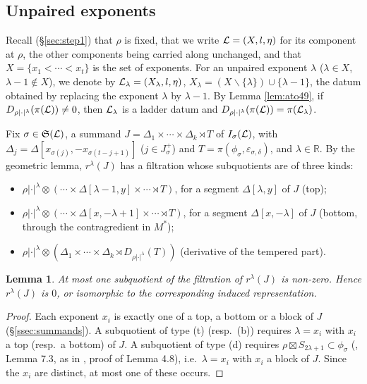 \documentclass[a4paper,12pt,leqno]{amsart}
\theoremstyle{plain}
\newtheorem{lemma}[thm]{Lemma}
\theoremstyle{definition}
\providecommand{\frS}{\mathfrak{S}}\providecommand{\frs}{\mathfrak{s}}
\begin{document}
\subsection{Unpaired exponents}\label{ssec:unpaired}
Recall (\S\ref{sec:step1}) that $\rho$ is fixed, that we write $\mathcal{L}=(X,l,\eta)$ for its component at
$\rho$, the other components being carried along unchanged, and that $X=\{x_1<\cdots<x_t\}$ is the set of
exponents. For an unpaired exponent $\lambda$ ($\lambda\in X$, $\lambda-1\notin X$), we denote by
$\mathcal{L}_\lambda=(X_\lambda,l,\eta)$, $X_\lambda=(X\smallsetminus\{\lambda\})\cup\{\lambda-1\}$, the datum obtained
by replacing the exponent $\lambda$ by $\lambda-1$. By Lemma \ref{lem:ato49}, if
$D_{\rho|\cdot|^\lambda}(\pi(\mathcal{L}))\neq0$, then $\mathcal{L}_\lambda$ is a ladder datum and
$D_{\rho|\cdot|^\lambda}(\pi(\mathcal{L}))=\pi(\mathcal{L}_\lambda)$.

Fix $\sigma\in\frS(\caL)$, a summand
$J=\Delta_1\times\cdots\times\Delta_k\rtimes T$ of $I_\sigma(\mathcal{L})$, with
$\Delta_j=\Delta[x_{\sigma(j)},-x_{\sigma(t-j+1)}]$ ($j\in J^+_\sigma$) and $T=\pi(\phi_\sigma,
\varepsilon_{\sigma,\delta})$, and $\lambda\in\mathbb{R}$. By the geometric lemma, $r^\lambda(J)$ has
a filtration whose subquotients are of three kinds:
\begin{itemize}
\item[(t)] $\rho|\cdot|^\lambda\otimes(\cdots\times\Delta[\lambda-1,y]\times\cdots\rtimes T)$, for
a segment $\Delta[\lambda,y]$ of $J$ (top);
\item[(b)] $\rho|\cdot|^\lambda\otimes(\cdots\times\Delta[x,-\lambda+1]\times\cdots\rtimes T)$, for
a segment $\Delta[x,-\lambda]$ of $J$ (bottom, through the contragredient in $M^*$);
\item[(d)] $\rho|\cdot|^\lambda\otimes(\Delta_1\times\cdots\times\Delta_k\rtimes
D_{\rho|\cdot|^\lambda}(T))$ (derivative of the tempered part).
\end{itemize}

\begin{lemma}\label{lem:onepiece} At most one subquotient of the filtration of $r^\lambda(J)$ is
non-zero. Hence $r^\lambda(J)$ is $0$, or isomorphic to the corresponding induced representation.
\end{lemma}

\begin{proof}
Each exponent $x_i$ is exactly one of a top, a bottom or a block of $J$ (\S\ref{ssec:summands}). A
subquotient of type (t) (resp.\ (b)) requires $\lambda=x_i$ with $x_i$ a top (resp.\ a bottom) of $J$. A
subquotient of type (d) requires $\rho\boxtimes S_{2\lambda+1}\subset\phi_\sigma$
(\cite{Xu17}, Lemma 7.3, as in \cite{Ato24}, proof of Lemma 4.8), i.e.\ $\lambda=x_i$ with $x_i$ a block
of $J$. Since the $x_i$ are distinct, at most one of these occurs.
\end{proof}
\end{document}
